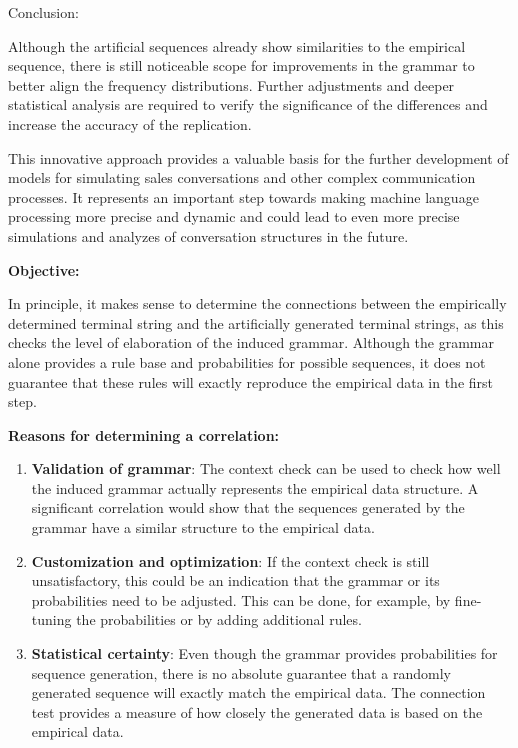\documentclass[
]{article}
\begin{document}
Conclusion:

Although the artificial sequences already show similarities to the
empirical sequence, there is still noticeable scope for improvements in
the grammar to better align the frequency distributions. Further
adjustments and deeper statistical analysis are required to verify the
significance of the differences and increase the accuracy of the
replication.

This innovative approach provides a valuable basis for the further
development of models for simulating sales conversations and other
complex communication processes. It represents an important step towards
making machine language processing more precise and dynamic and could
lead to even more precise simulations and analyzes of conversation
structures in the future.

\textbf{Objective:}

In principle, it makes sense to determine the connections between the
empirically determined terminal string and the artificially generated
terminal strings, as this checks the level of elaboration of the induced
grammar. Although the grammar alone provides a rule base and
probabilities for possible sequences, it does not guarantee that these
rules will exactly reproduce the empirical data in the first step.

\textbf{Reasons for determining a correlation:}

\begin{enumerate}
\def\labelenumi{\arabic{enumi}.}
\item
  \textbf{Validation of grammar}: The context check can be used to check
  how well the induced grammar actually represents the empirical data
  structure. A significant correlation would show that the sequences
  generated by the grammar have a similar structure to the empirical
  data.
\item
  \textbf{Customization and optimization}: If the context check is still
  unsatisfactory, this could be an indication that the grammar or its
  probabilities need to be adjusted. This can be done, for example, by
  fine-tuning the probabilities or by adding additional rules.
\item
  \textbf{Statistical certainty}: Even though the grammar provides
  probabilities for sequence generation, there is no absolute guarantee
  that a randomly generated sequence will exactly match the empirical
  data. The connection test provides a measure of how closely the
  generated data is based on the empirical data.
\end{enumerate}
\end{document}
